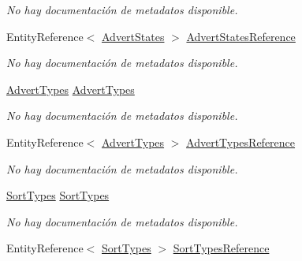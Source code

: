 \begin{DoxyCompactItemize}
\begin{DoxyCompactList}\small\item\em No hay documentación de metadatos disponible. \end{DoxyCompactList}\item 
Entity\-Reference$<$ \hyperlink{class_game_memory_1_1_advert_states}{Advert\-States} $>$ \hyperlink{class_game_memory_1_1_adverts_a5238fd71f38608ac56eb5eac5e0fe270}{Advert\-States\-Reference}
\begin{DoxyCompactList}\small\item\em No hay documentación de metadatos disponible. \end{DoxyCompactList}\item 
\hyperlink{class_game_memory_1_1_advert_types}{Advert\-Types} \hyperlink{class_game_memory_1_1_adverts_a430fdeb87c0491d6a0c52aa2ce601673}{Advert\-Types}
\begin{DoxyCompactList}\small\item\em No hay documentación de metadatos disponible. \end{DoxyCompactList}\item 
Entity\-Reference$<$ \hyperlink{class_game_memory_1_1_advert_types}{Advert\-Types} $>$ \hyperlink{class_game_memory_1_1_adverts_a12c5b442cf5e4ba2e320e1019aaaa5d5}{Advert\-Types\-Reference}
\begin{DoxyCompactList}\small\item\em No hay documentación de metadatos disponible. \end{DoxyCompactList}\item 
\hyperlink{class_game_memory_1_1_sort_types}{Sort\-Types} \hyperlink{class_game_memory_1_1_adverts_a1466cfee905d0224c01bf20ef517ecfb}{Sort\-Types}
\begin{DoxyCompactList}\small\item\em No hay documentación de metadatos disponible. \end{DoxyCompactList}\item 
Entity\-Reference$<$ \hyperlink{class_game_memory_1_1_sort_types}{Sort\-Types} $>$ \hyperlink{class_game_memory_1_1_adverts_a0e104d4a5eb16d3fe324396a2982eff3}{Sort\-Types\-Reference}

\end{DoxyCompactItemize}
